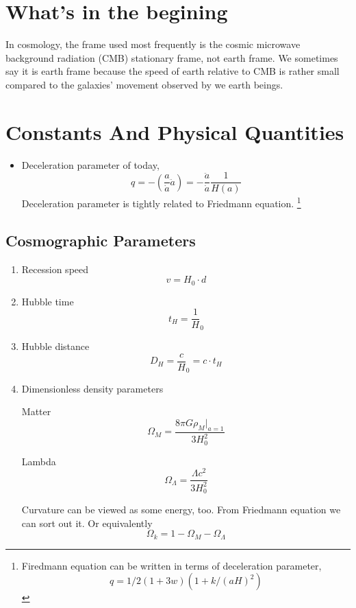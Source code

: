 \section{What's in the begining}

In cosmology, the frame used most frequently is the cosmic microwave background radiation (CMB) stationary frame,  not earth frame. We sometimes say it is earth frame because the speed of earth relative to CMB is rather small compared to the galaxies' movement observed by we earth beings.



\section{Constants And Physical Quantities}

\begin{itemize}
\item
Deceleration parameter of today, 
\[q=-\left( \frac{a}{\dot a}\ddot a \right)=-\frac{\ddot a}{\dot a}\frac{1}{H(a)}\]
Deceleration parameter is tightly related to Friedmann equation.
\footnote{Firedmann equation can be written in terms of deceleration parameter,\[q=1/2(1+3w)(1+k/(aH)^2)\]}


\end{itemize}


\subsection{Cosmographic Parameters}
\begin{enumerate}
\item
Recession speed
\begin{equation}
v = H_0 \cdot d
\end{equation}

\item
Hubble time
\begin{equation}
	t_H = \frac 1 H_0
\end{equation}

\item
Hubble distance
\begin{equation}
	D_H = \frac c H_0 = c \cdot t_H
\end{equation}

\item
Dimensionless density parameters

Matter
\begin{equation}
	\Omega_M = \frac{8\pi G \rho_M |_{a=1}}{3H_0^2}
\end{equation}

Lambda
\begin{equation}
	\Omega_\Lambda = \frac{\Lambda c^2}{3H_0^2}
\end{equation}

Curvature can be viewed as some energy, too.
From Friedmann equation we can sort out it. Or equivalently
\begin{equation}
	\Omega_k = 1- \Omega_M- \Omega_\Lambda
\end{equation}

\end{enumerate}




